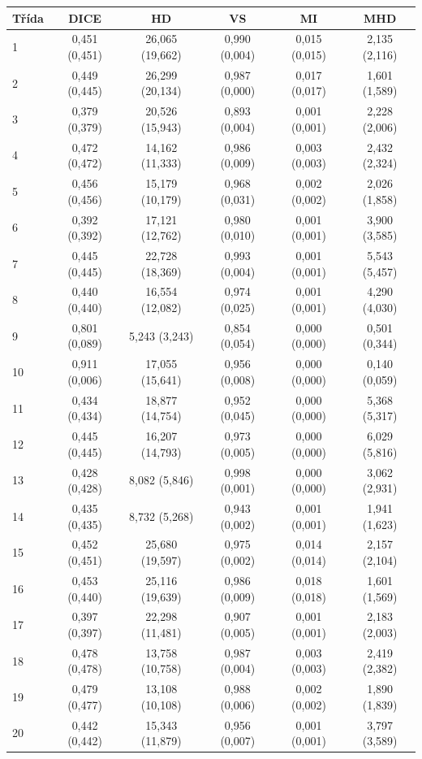 \begin{tabular}{l c c c c c}
 \hline
Třída & DICE & HD & VS & MI & MHD \\ \hline
1 & 0,451 (0,451) & 26,065 (19,662) & 0,990 (0,004) & 0,015 (0,015) & 2,135 (2,116) \\
2 & 0,449 (0,445) & 26,299 (20,134) & 0,987 (0,000) & 0,017 (0,017) & 1,601 (1,589) \\
3 & 0,379 (0,379) & 20,526 (15,943) & 0,893 (0,004) & 0,001 (0,001) & 2,228 (2,006) \\
4 & 0,472 (0,472) & 14,162 (11,333) & 0,986 (0,009) & 0,003 (0,003) & 2,432 (2,324) \\
5 & 0,456 (0,456) & 15,179 (10,179) & 0,968 (0,031) & 0,002 (0,002) & 2,026 (1,858) \\
6 & 0,392 (0,392) & 17,121 (12,762) & 0,980 (0,010) & 0,001 (0,001) & 3,900 (3,585) \\
7 & 0,445 (0,445) & 22,728 (18,369) & 0,993 (0,004) & 0,001 (0,001) & 5,543 (5,457) \\
8 & 0,440 (0,440) & 16,554 (12,082) & 0,974 (0,025) & 0,001 (0,001) & 4,290 (4,030) \\
9 & 0,801 (0,089) & 5,243 (3,243) & 0,854 (0,054) & 0,000 (0,000) & 0,501 (0,344) \\
10 & 0,911 (0,006) & 17,055 (15,641) & 0,956 (0,008) & 0,000 (0,000) & 0,140 (0,059) \\
11 & 0,434 (0,434) & 18,877 (14,754) & 0,952 (0,045) & 0,000 (0,000) & 5,368 (5,317) \\
12 & 0,445 (0,445) & 16,207 (14,793) & 0,973 (0,005) & 0,000 (0,000) & 6,029 (5,816) \\
13 & 0,428 (0,428) & 8,082 (5,846) & 0,998 (0,001) & 0,000 (0,000) & 3,062 (2,931) \\
14 & 0,435 (0,435) & 8,732 (5,268) & 0,943 (0,002) & 0,001 (0,001) & 1,941 (1,623) \\
15 & 0,452 (0,451) & 25,680 (19,597) & 0,975 (0,002) & 0,014 (0,014) & 2,157 (2,104) \\
16 & 0,453 (0,440) & 25,116 (19,639) & 0,986 (0,009) & 0,018 (0,018) & 1,601 (1,569) \\
17 & 0,397 (0,397) & 22,298 (11,481) & 0,907 (0,005) & 0,001 (0,001) & 2,183 (2,003) \\
18 & 0,478 (0,478) & 13,758 (10,758) & 0,987 (0,004) & 0,003 (0,003) & 2,419 (2,382) \\
19 & 0,479 (0,477) & 13,108 (10,108) & 0,988 (0,006) & 0,002 (0,002) & 1,890 (1,839) \\
20 & 0,442 (0,442) & 15,343 (11,879) & 0,956 (0,007) & 0,001 (0,001) & 3,797 (3,589) \\

\end{tabular}
